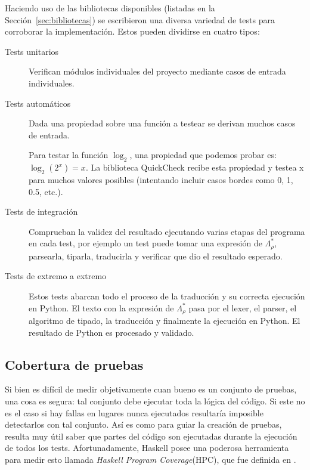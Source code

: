Haciendo uso de las bibliotecas disponibles (listadas en la Sección~\ref{sec:bibliotecas}) se escribieron una diversa variedad de tests para corroborar la implementación. Estos pueden dividirse en cuatro tipos:
\begin{description}
    \item[Tests unitarios] Verifican módulos individuales del proyecto mediante casos de entrada individuales.
    \item[Tests automáticos] Dada una propiedad sobre una función a testear se derivan muchos casos de entrada.
\begin{ejemplo}
    Para testar la función $\log_2$, una propiedad que podemos probar es: $\log_2(2^x) = x$. La biblioteca QuickCheck recibe esta propiedad y testea x para muchos valores posibles (intentando incluir casos bordes como 0, 1, 0.5, etc.).
\end{ejemplo}
    \item[Tests de integración] Comprueban la validez del resultado ejecutando varias etapas del programa en cada test, por ejemplo un test puede tomar una expresión de $\Lambda_\rho^*$, parsearla, tiparla, traducirla y verificar que dio el resultado esperado.
    \item[Tests de extremo a extremo] Estos tests abarcan todo el proceso de la traducción y su correcta ejecución en Python. El texto con la expresión de $\Lambda_\rho^*$ pasa por el lexer, el parser, el algoritmo de tipado, la traducción y finalmente la ejecución en Python. El resultado de Python es procesado y validado.
\end{description}

\subsection{Cobertura de pruebas}
Si bien es difícil de medir objetivamente cuan bueno es un conjunto de pruebas, una cosa es segura: tal conjunto debe ejecutar toda la lógica del código. Si este no es el caso si hay fallas en lugares nunca ejecutados resultaría imposible detectarlos con tal conjunto. Así es como para guiar la creación de pruebas, resulta muy útil saber que partes del código son ejecutadas durante la ejecución de todos los tests. Afortunadamente, Haskell posee una poderosa herramienta para medir esto llamada \emph{Haskell Program Coverage}(HPC), que fue definida en \cite{hpc}.

